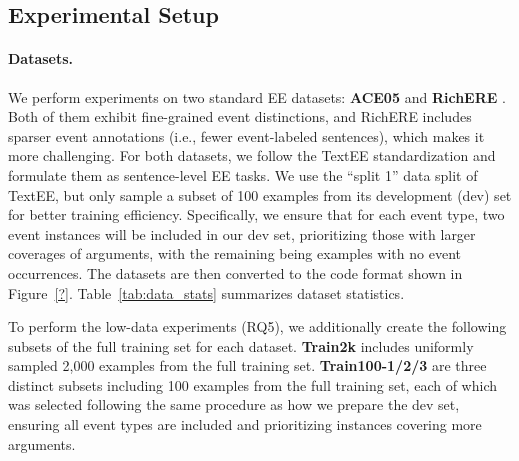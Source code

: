 \subsection{Experimental Setup} 


%
%

\paragraph{Datasets.}
We perform experiments on two standard EE datasets: \textbf{ACE05} \cite{X} and \textbf{RichERE} \cite{Y}. Both of them exhibit fine-grained event distinctions, and RichERE includes sparser event annotations (i.e., fewer event-labeled sentences), which makes it more challenging. 
For both datasets, we follow the TextEE standardization \cite{huang2024textee} and formulate them as sentence-level EE tasks. We use the ``split 1'' data split of TextEE, but only sample a subset of 100 examples from its development (dev) set for better training efficiency. Specifically, we ensure that for each event type, two event instances will be included in our dev set, prioritizing those with larger coverages of arguments, with the remaining being examples with no event occurrences. The datasets are then converted to the code format shown in Figure~\ref{?}. Table~\ref{tab:data_stats} summarizes dataset statistics.

To perform the low-data experiments (RQ5), we additionally create the following subsets of the full training set for each dataset. \textbf{Train2k} includes uniformly sampled 2,000 examples from the full training set. \textbf{Train100-1/2/3} are three distinct subsets including 100 examples from the full training set, each of which was selected following the same procedure as how we prepare the dev set, ensuring all event types are included and prioritizing instances covering more arguments.



